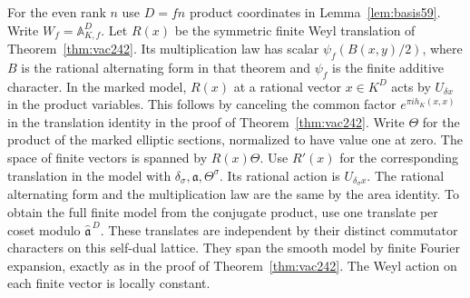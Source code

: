 \documentclass[a4paper,11pt]{article}
\theoremstyle{definition}
\theoremstyle{remark}
\numberwithin{equation}{section}
\begin{document}
For the even rank \(n\) use \(D=fn\) product coordinates in
Lemma~\ref{lem:basis59}. Write \(W_f=\mathbb A_{K,f}^D\).
Let \(R(x)\) be the symmetric finite Weyl translation of
Theorem~\ref{thm:vac242}. Its multiplication law has scalar
\(\psi_f(B(x,y)/2)\), where \(B\) is the rational alternating
form in that theorem and \(\psi_f\) is the finite additive
character. In the marked model, \(R(x)\) at a rational vector
\(x\in K^D\) acts by \(U_{\delta x}\) in the product variables.
This follows by canceling the common factor
\(e^{\pi i h_K(x,x)}\) in the translation identity in the proof
of Theorem~\ref{thm:vac242}. Write \(\Theta\) for the product of
the marked elliptic sections, normalized to have value one at
zero. The space of finite vectors is spanned by \(R(x)\Theta\).
Use \(R'(x)\) for the corresponding translation in the model
with \(\delta_\sigma,\mathfrak a,\Theta^\sigma\). Its rational
action is \(U_{\delta_\sigma x}\). The rational alternating
form and the multiplication law are the same by the area identity.
To obtain the full finite model from the conjugate product,
use one translate per coset modulo
\(\widehat{\mathfrak a}^{\,D}\). These translates are independent
by their distinct commutator characters on this self-dual lattice.
They span the smooth model by finite Fourier expansion, exactly
as in the proof of Theorem~\ref{thm:vac242}. The Weyl action on
each finite vector is locally constant.
\end{document}
